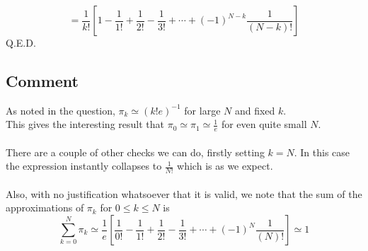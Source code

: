 \begin{equation*} 
 =  \frac{1}{k!} \left[ 1 - \frac{1}{1!} +  \frac{1}{2!} - \frac{1}{3!} + \cdots  +  (-1)^{N-k}\frac{1}{(N-k)!}\right] 
\end{equation*} {\Large Q.E.D.}

\subsection{Comment}
As noted in the question,  $\pi_k \simeq (k!e)^{-1} $ for large $N$ and fixed $k$.\\
This gives the interesting result that  $\pi_0 \simeq \pi_1 \simeq \frac{1}{e}$ for even quite small $N$. \\
\  \\
There are a couple of other checks we can do, firstly setting $k=N$. In this case the expression instantly collapses to $\frac{1}{N!}$ which is as we expect. \\
\  \\
Also, with no justification whatsoever that it is valid, we note that the sum of the approximations of $\pi_k$ for $0 \leq k \leq N$ is 
\begin{equation*} 
 \sum_{k=0}^N\pi_k \simeq \frac{1}{e} \left[ \frac{1}{0!} - \frac{1}{1!} +  \frac{1}{2!} - \frac{1}{3!} + \cdots  +  (-1)^{N}\frac{1}{(N)!}\right] \simeq 1 
\end{equation*}
